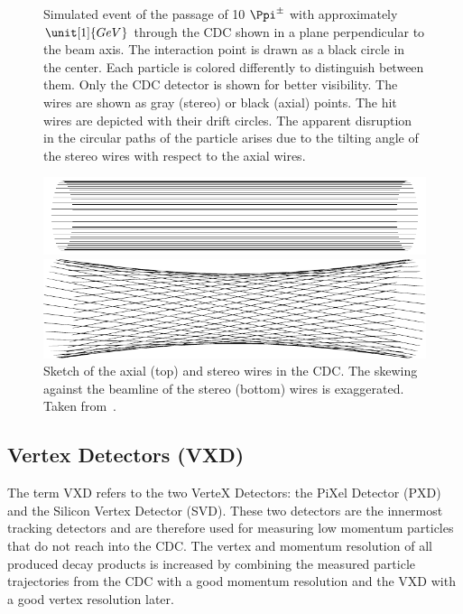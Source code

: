 \begin{figure}
\begin{tikzpicture}
  \end{tikzpicture}
  \caption[Simulated event of the passage of 10 $\Ppi^\pm$ through the CDC.]{Simulated event of the passage of 10 $\Ppi^\pm$ with approximately $\unit[1]{GeV}$ through the CDC shown in a plane perpendicular to the beam axis. The interaction point is drawn as a black circle in the center. Each particle is colored differently to distinguish between them. Only the CDC detector is shown for better visibility. The wires are shown as gray (stereo) or black (axial) points. The hit wires are depicted with their drift circles. The apparent disruption in the circular paths of the particle arises due to the tilting angle of the stereo wires with respect to the axial wires.}
  \label{fig-event-display}
\end{figure}

\begin{figure}
  \centering
  \includegraphics{figures/experimental_setup/axialLayers.pdf}
  
  \vspace*{1.5cm}
  
  \includegraphics{figures/experimental_setup/stereoLayers.pdf}
  \caption[Sketch of the axial (top) and stereo wires in the CDC.]{Sketch of the axial (top) and stereo wires in the CDC. The skewing against the beamline of the stereo (bottom) wires is exaggerated. Taken from~\cite{oliver}.}
  \label{fig-axial-stereo}
\end{figure}

\subsection{Vertex Detectors (VXD)}
The term VXD refers to the two VerteX Detectors: the PiXel Detector (PXD) and the Silicon Vertex Detector (SVD). These two detectors are the innermost tracking detectors and are therefore used for measuring low momentum particles that do not reach into the CDC. The vertex and momentum resolution of all produced decay products is increased by combining the measured particle trajectories from the CDC with a good momentum resolution and the VXD with a good vertex resolution later.

